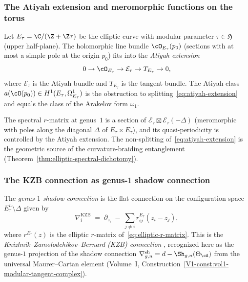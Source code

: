 \subsubsection{The Atiyah extension and meromorphic functions on
the torus}

Let $E_\tau = \C / (\Z + \Z\tau)$ be the elliptic curve with
modular parameter $\tau \in \mathfrak{H}$ (upper half-plane).
The holomorphic line bundle $\cO_{E_\tau}(p_0)$ (sections with at
most a simple pole at the origin $p_0$) fits into the
\emph{Atiyah extension}
\begin{equation}
0 \to \cO_{E_\tau} \to \mathcal{E}_\tau \to
T_{E_\tau} \to 0,
\end{equation}
where $\mathcal{E}_\tau$ is the Atiyah bundle and $T_{E_\tau}$ is
the tangent bundle. The Atiyah class
$a(\cO(p_0)) \in H^1(E_\tau, \Omega^1_{E_\tau})$ is the
obstruction to splitting~\eqref{eq:atiyah-extension} and equals
the class of the Arakelov form $\omega_1$.

The spectral $r$-matrix at genus~$1$ is a section of
$\mathcal{E}_\tau \boxtimes \mathcal{E}_\tau(-\Delta)$
(meromorphic with poles along the diagonal $\Delta$ of
$E_\tau \times E_\tau$), and its quasi-periodicity is controlled
by the Atiyah extension. The non-splitting of~\eqref{eq:atiyah-extension}
is the geometric source of the curvature-braiding entanglement
(Theorem~\ref{thm:elliptic-spectral-dichotomy}).

\subsubsection{The KZB connection as genus-$1$ shadow connection}

\begin{definition}
The \emph{genus-$1$ shadow connection} is the flat connection on
the configuration space $E_\tau^n \setminus \Delta$ given by
\begin{equation}
\nabla_i^{\mathrm{KZB}}
\;=\;
\partial_{z_i}
\;-\;
\sum_{j \ne i}
r^{E_\tau}_{ij}(z_i - z_j),
\end{equation}
where $r^{E_\tau}(z)$ is the elliptic $r$-matrix
of~\eqref{eq:elliptic-r-matrix}. This is the
\emph{Knizhnik--Zamolodchikov--Bernard (KZB) connection}
\cite{Ber88}, recognized here as the genus-$1$ projection of the
shadow connection
$\nabla^{\mathrm{sh}}_{g,n} = d - \Sh_{g,n}(\Theta_\cA)$
from the universal Maurer--Cartan element
(Volume~I, Construction~\ref*{V1-const:vol1-modular-tangent-complex}).
\end{definition}

